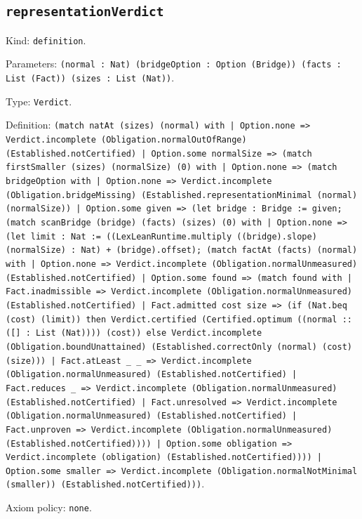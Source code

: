 \documentclass[11pt]{article}
\begin{document}
\subsection*{\texttt{representationVerdict}}
\noindent Kind: \texttt{definition}.\par
\noindent Parameters: \texttt{(normal : Nat) (bridgeOption : Option (Bridge)) (facts : List (Fact)) (sizes : List (Nat))}.\par
\noindent Type: \texttt{Verdict}.\par
\noindent Definition: \texttt{(match natAt (sizes) (normal) with | Option.none => Verdict.incomplete (Obligation.normalOutOfRange) (Established.notCertified) | Option.some normalSize => (match firstSmaller (sizes) (normalSize) (0) with | Option.none => (match bridgeOption with | Option.none => Verdict.incomplete (Obligation.bridgeMissing) (Established.representationMinimal (normal) (normalSize)) | Option.some given => (let bridge : Bridge := given; (match scanBridge (bridge) (facts) (sizes) (0) with | Option.none => (let limit : Nat := ((LexLeanRuntime.multiply ((bridge).slope) (normalSize) : Nat) + (bridge).offset); (match factAt (facts) (normal) with | Option.none => Verdict.incomplete (Obligation.normalUnmeasured) (Established.notCertified) | Option.some found => (match found with | Fact.inadmissible => Verdict.incomplete (Obligation.normalUnmeasured) (Established.notCertified) | Fact.admitted cost size => (if (Nat.beq (cost) (limit)) then Verdict.certified (Certified.optimum ((normal :: ([] : List (Nat)))) (cost)) else Verdict.incomplete (Obligation.boundUnattained) (Established.correctOnly (normal) (cost) (size))) | Fact.atLeast \_ \_ => Verdict.incomplete (Obligation.normalUnmeasured) (Established.notCertified) | Fact.reduces \_ => Verdict.incomplete (Obligation.normalUnmeasured) (Established.notCertified) | Fact.unresolved => Verdict.incomplete (Obligation.normalUnmeasured) (Established.notCertified) | Fact.unproven => Verdict.incomplete (Obligation.normalUnmeasured) (Established.notCertified)))) | Option.some obligation => Verdict.incomplete (obligation) (Established.notCertified)))) | Option.some smaller => Verdict.incomplete (Obligation.normalNotMinimal (smaller)) (Established.notCertified)))}.\par
\noindent Axiom policy: \texttt{none}.\par
\end{document}
